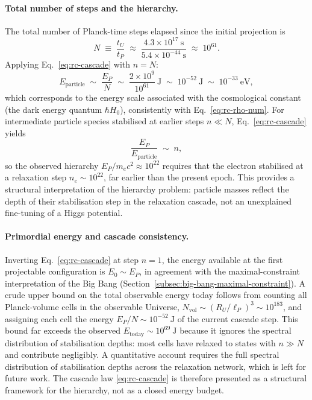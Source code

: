    \paragraph{Total number of steps and the hierarchy.}
      The total number of Planck-time steps elapsed since the initial projection is
    \begin{equation}
      \label{eq:rc-N}
      N \;\equiv\; \frac{t_U}{t_P}
      \;\approx\; \frac{4.3 \times 10^{17}~\mathrm{s}}{5.4 \times 10^{-44}~\mathrm{s}}
      \;\approx\; 10^{61}.
      \end{equation}
      Applying Eq.~\eqref{eq:rc-cascade} with $n = N$:
    \begin{equation}
      \label{eq:rc-Eparticle}
      E_\mathrm{particle}
      \;\sim\; \frac{E_P}{N}
      \;\sim\; \frac{2 \times 10^9}{10^{61}}~\mathrm{J}
      \;\sim\; 10^{-52}~\mathrm{J}
      \;\sim\; 10^{-33}~\mathrm{eV},
      \end{equation}
      which corresponds to the energy scale associated with the cosmological
      constant (the dark energy quantum $\hbar H_0$), consistently with Eq.~\eqref{eq:rc-rho-num}.
      For intermediate particle species stabilised at earlier steps
      $n \ll N$, Eq.~\eqref{eq:rc-cascade} yields
    \begin{equation}
      \label{eq:rc-hierarchy}
      \frac{E_P}{E_\mathrm{particle}}
      \;\sim\; n,
      \end{equation}
      so the observed hierarchy $E_P/m_e c^2 \approx 10^{22}$ requires
      that the electron stabilised at a relaxation step
      $n_e \sim 10^{22}$, far earlier than the present epoch.
      This provides a structural interpretation of the hierarchy problem:
      particle masses reflect the depth of their stabilisation step in the
      relaxation cascade, not an unexplained fine-tuning of a Higgs potential.

    \paragraph{Primordial energy and cascade consistency.}
      Inverting Eq.~\eqref{eq:rc-cascade} at step $n = 1$, the energy
      available at the first projectable configuration is $E_0 \sim E_P$,
      in agreement with the maximal-constraint interpretation of the Big Bang
      (Section~\ref{subsec:big-bang-maximal-constraint}).
      A crude upper bound on the total observable energy today follows from
      counting all Planck-volume cells in the observable Universe,
      $N_\mathrm{vol} \sim (R_U/\ell_P)^3 \sim 10^{183}$, and assigning
      each cell the energy $E_P/N \sim 10^{-52}~\mathrm{J}$ of the current cascade step.
      This bound far exceeds the observed $E_\mathrm{today} \sim 10^{69}~\mathrm{J}$
      because it ignores the spectral distribution of stabilisation depths:
      most cells have relaxed to states with $n \gg N$ and contribute negligibly.
      A quantitative account requires the full spectral distribution of
      stabilisation depths across the relaxation network, which is left for future work.
      The cascade law \eqref{eq:rc-cascade} is therefore presented as a
      structural framework for the hierarchy, not as a closed energy budget.

